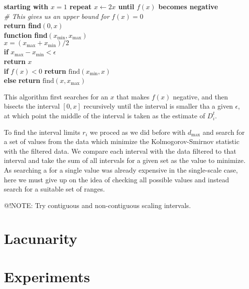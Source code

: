 \documentclass[10pt]{article}
\begin{document}
\begin{pseudo}[h]
	\textbf{starting with $x = 1$ repeat $x \leftarrow 2x$ until $f(x)$ becomes negative}  \\
	\hspace*{5mm}\textit{\# This gives us an upper bound for $f(x) = 0$}\\
	\textbf{return find}$(0, x)$ \\
	
	\textbf{function find}$(x_{\min}, x_{\max})$ \\
	\hspace*{5mm} $x = (x_{\max} + x_{\min})/2$ \\
	\hspace*{5mm} \textbf{if} $x_{\max} - x_{\min} < \epsilon$ \\
	\hspace*{10mm} \textbf{return} $x$\\
	\hspace*{5mm} \textbf{if} $f(x) < 0$
	\textbf{return} $\mbox{find}(x_{\min}, x)$ \\ 
	\hspace*{5mm} \textbf{else} 
 	\textbf{return} $\mbox{find}(x, x_{\max})$ \\	
\end{pseudo}

This algorithm first searches for an $x$ that makes $f(x)$ negative, and then bisects the interval $[0, x]$ recursively until the interval is smaller tha a given $\epsilon$, at which point the middle of the interval is taken as the estimate of $D_i^t$.

To find the interval limits $r_i$ we proced as we did before with $d_{\max}$ and search for a set of values from the data which minimize the Kolmogorov-Smirnov statistic with the filtered data. We compare each interval with the data filtered to that interval and take the sum of all intervals for a given set as the value to minimize. As searching a for a single value was already expensive in the single-scale case, here we must give up on the idea of checking all possible values and instead search for a suitable set of ranges.  

@!NOTE: Try contiguous and non-contiguous scaling intervals. 

\section{Lacunarity}



\section{Experiments}
\end{document}
